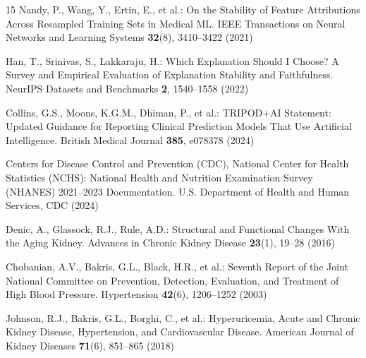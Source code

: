 \documentclass[runningheads]{llncs}
\begin{document}
\begin{thebibliography}{15}
 Nandy, P., Wang, Y., Ertin, E., et al.: On the Stability of Feature Attributions Across Resampled Training Sets in Medical ML. IEEE Transactions on Neural Networks and Learning Systems \textbf{32}(8), 3410--3422 (2021)

 Han, T., Srinivas, S., Lakkaraju, H.: Which Explanation Should I Choose? A Survey and Empirical Evaluation of Explanation Stability and Faithfulness. NeurIPS Datasets and Benchmarks \textbf{2}, 1540--1558 (2022)

 Collins, G.S., Moons, K.G.M., Dhiman, P., et al.: TRIPOD+AI Statement: Updated Guidance for Reporting Clinical Prediction Models That Use Artificial Intelligence. British Medical Journal \textbf{385}, e078378 (2024)

 Centers for Disease Control and Prevention (CDC), National Center for Health Statistics (NCHS): National Health and Nutrition Examination Survey (NHANES) 2021–2023 Documentation. U.S. Department of Health and Human Services, CDC (2024)

 Denic, A., Glassock, R.J., Rule, A.D.: Structural and Functional Changes With the Aging Kidney. Advances in Chronic Kidney Disease \textbf{23}(1), 19--28 (2016)

 Chobanian, A.V., Bakris, G.L., Black, H.R., et al.: Seventh Report of the Joint National Committee on Prevention, Detection, Evaluation, and Treatment of High Blood Pressure. Hypertension \textbf{42}(6), 1206--1252 (2003)

 Johnson, R.J., Bakris, G.L., Borghi, C., et al.: Hyperuricemia, Acute and Chronic Kidney Disease, Hypertension, and Cardiovascular Disease. American Journal of Kidney Diseases \textbf{71}(6), 851--865 (2018)
\end{thebibliography}
\end{document}
